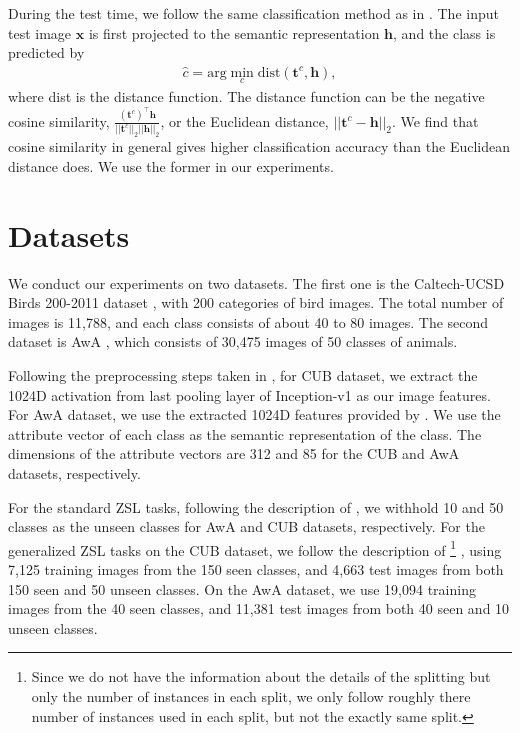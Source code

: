 \documentclass{article}
\newcommand{\bb}[1]{\boldsymbol{#1}}
\begin{document}
During the test time, we follow the same classification method as in \cite{kodirov2017semantic}. The input test image $\bb{x}$ is first projected to the semantic representation $\bb{h}$, and the class is predicted by
\begin{align}
	\hat{c} = \textrm{arg} \min_c \textrm{dist}(\bb{t}^c, \bb{h}),
\end{align}
where dist is the distance function. The distance function can be the negative cosine similarity, $\frac{(\bb{t}^c)^{\top} \bb{h}}{||\bb{t}^c||_2 ||\bb{h}||_2}$, or the Euclidean distance, $||\bb{t}^c - \bb{h}||_2$. We find that cosine similarity in general gives higher classification accuracy than the Euclidean distance does. We use the former in our experiments.



\section{Datasets}

We conduct our experiments on two datasets. The first one is the Caltech-UCSD Birds 200-2011 dataset \cite{wah2011caltech}, with 200 categories of bird images. The total number of images is 11,788, and each class consists of about 40 to 80 images. The second dataset is AwA \cite{lampert2014attribute}, which consists of 30,475 images of 50 classes of animals.

Following the preprocessing steps taken in \cite{kodirov2017semantic}, for CUB dataset, we extract the 1024D activation from last pooling layer of Inception-v1 \cite{szegedy2015going} as our image features. For AwA dataset, we use the extracted 1024D features provided by \cite{kodirov2017semantic}. We use the attribute vector of each class as the semantic representation of the class. The dimensions of the attribute vectors are 312 and 85 for the CUB and AwA datasets, respectively.

For the standard ZSL tasks, following the description of \cite{kodirov2017semantic}, we withhold 10 and 50 classes as the unseen classes for AwA and CUB datasets, respectively. For the generalized ZSL tasks on the CUB dataset, we follow the description of \cite{Xian2017}%
\footnote{Since we do not have the information about the details of the splitting but only the number of instances in each split, we only follow roughly there number of instances used in each split, but not the exactly same split.}%
, using 7,125 training images from the 150 seen classes, and 4,663 test images from both 150 seen and 50 unseen classes. On the AwA dataset, we use 19,094 training images from the 40 seen classes, and 11,381 test images from both 40 seen and 10 unseen classes.
\end{document}
